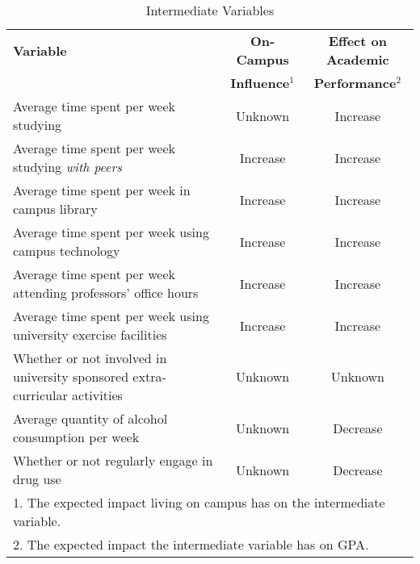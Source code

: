 \documentclass[11pt]{article}
\begin{document}
\begin{table}[h!] \caption{Intermediate Variables} \label{tb:intstep}
\begin{center}
\begin{tabular}{p{3in}cc} \hline \hline
\textbf{Variable} & \textbf{On-Campus} & \textbf{Effect on Academic} \\ 
& \textbf{Influence$^{1}$}& \textbf{Performance$^{2}$}\\ \hline \hline
Average time spent per week studying & Unknown & Increase \\  \hline
Average time spent per week studying \textit{with peers} & Increase & Increase \\\hline
Average time spent per week in campus library & Increase & Increase \\\hline
Average time spent per week using campus technology & Increase & Increase \\\hline
Average time spent per week attending professors' office hours & Increase & Increase \\\hline
Average time spent per week using university exercise facilities & Increase & Increase \\\hline
Whether or not involved in university sponsored extra-curricular activities & Unknown & Unknown \\\hline
Average quantity of alcohol consumption per week & Unknown & Decrease \\\hline
Whether or not regularly engage in drug use & Unknown & Decrease \\ \hline \hline
\multicolumn{3}{p{5in}}{\small{1. The expected impact living on campus has on the intermediate variable.}} \\
\multicolumn{3}{p{5in}}{\small{2. The expected impact the intermediate variable has on GPA.}} \\
\end{tabular}
\end{center}
\end{table}
\end{document}
